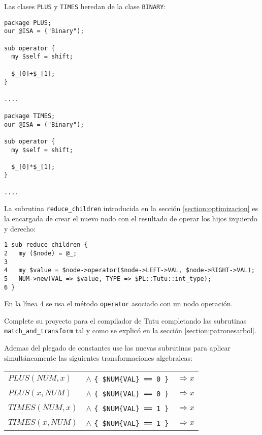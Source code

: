 Las clases \verb|PLUS| y \verb|TIMES| 
heredan de la clase \verb|BINARY|:
\begin{verbatim}
package PLUS;
our @ISA = ("Binary");

sub operator {
  my $self = shift;

  $_[0]+$_[1];
}

....

package TIMES;
our @ISA = ("Binary");

sub operator {
  my $self = shift;

  $_[0]*$_[1];
}

....
\end{verbatim}

La subrutina \verb|reduce_children| introducida en la
sección 
\ref{section:optimizacion}
es la encargada 
de crear el nuevo nodo con el resultado de operar los
hijos izquierdo y derecho:

\begin{verbatim}
1 sub reduce_children {
2   my ($node) = @_;
3 
4   my $value = $node->operator($node->LEFT->VAL, $node->RIGHT->VAL);
5   NUM->new(VAL => $value, TYPE => $PL::Tutu::int_type);
6 }
\end{verbatim}

En la línea 4 se usa el método \verb|operator| asociado 
con un nodo operación. 

\label{practica:casandoytransformando}
Complete su proyecto para el compilador de Tutu completando
las subrutinas \verb|match_and_transform| tal y como se explicó en la sección
\ref{section:patronesarbol}.

Ademas del plegado
de constantes use las nuevas subrutinas 
para aplicar simultáneamente 
las siguientes transformaciones algebraicas:

\vspace{0.25cm}
\begin{tabular}{lll}
$PLUS(NUM, x)$  & $\wedge$ \verb|{ $NUM{VAL} == 0 }| & $\Longrightarrow x$\\ 
$PLUS(x, NUM)$  & $\wedge$ \verb|{ $NUM{VAL} == 0 }| & $\Longrightarrow x$  \\ 
$TIMES(NUM, x)$ & $\wedge$ \verb|{ $NUM{VAL} == 1 }| & $\Longrightarrow x$ \\ 
$TIMES(x, NUM)$ & $\wedge$ \verb|{ $NUM{VAL} == 1 }| & $\Longrightarrow x$  
\end{tabular}
\vspace{0.25cm}

